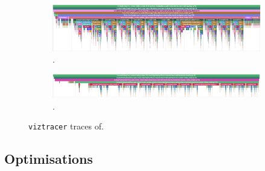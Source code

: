 \begin{figure}[H]
    \centering
    \begin{subfigure}[b]{\textwidth}
        \centering
        \includegraphics[width=\textwidth]{images/specialising_optimising_xdsl_rewriting/custom_constant_fold.png}
        \captionsetup{width=0.8\textwidth}
        \caption{.}
        \label{fig:constant-fold-original-viztracer}
    \end{subfigure}
    \begin{subfigure}[b]{\textwidth}
        \centering
        \includegraphics[width=\textwidth]{images/specialising_optimising_xdsl_rewriting/optimised_constant_fold.png}
        \captionsetup{width=0.8\textwidth}
        \caption{.}
        \label{fig:constant-fold-optimised-viztracer}
    \end{subfigure}
    \caption{\texttt{viztracer} traces of.}
    \label{fig:constant-fold-viztracer}
\end{figure}



\subsection{Optimisations}
\label{sec:specialising-pattern-rewriting-optimisations}










